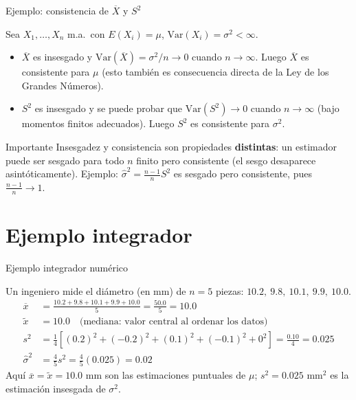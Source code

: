 \documentclass[aspectratio=169,11pt]{beamer}
\begin{document}
\begin{frame}{Ejemplo: consistencia de $\overline X$ y $S^2$}
\begin{example}
Sea $X_1,\dots,X_n$ m.a.\ con $E(X_i)=\mu$, $\mathrm{Var}(X_i)=\sigma^2<\infty$.
\begin{itemize}
\item $\overline X$ es insesgado y $\mathrm{Var}(\overline X) = \sigma^2/n \to 0$ cuando $n\to\infty$. Luego $\overline X$ es consistente para $\mu$ (esto también es consecuencia directa de la Ley de los Grandes Números).
\item $S^2$ es insesgado y se puede probar que $\mathrm{Var}(S^2)\to 0$ cuando $n\to\infty$ (bajo momentos finitos adecuados). Luego $S^2$ es consistente para $\sigma^2$.
\end{itemize}
\end{example}

\begin{alertblock}{Importante}
Insesgadez y consistencia son propiedades \textbf{distintas}: un estimador puede ser sesgado para todo $n$ finito pero consistente (el sesgo desaparece asintóticamente). Ejemplo: $\widehat\sigma^2 = \frac{n-1}{n}S^2$ es sesgado pero consistente, pues $\frac{n-1}{n}\to 1$.
\end{alertblock}
\end{frame}

\section{Ejemplo integrador}

\begin{frame}{Ejemplo integrador numérico}
\begin{example}
Un ingeniero mide el diámetro (en mm) de $n=5$ piezas: $10.2,\ 9.8,\ 10.1,\ 9.9,\ 10.0$.
\begin{align*}
\overline x &= \frac{10.2+9.8+10.1+9.9+10.0}{5} = \frac{50.0}{5} = 10.0 \\
\widetilde x &= 10.0 \quad \text{(mediana: valor central al ordenar los datos)}\\
s^2 &= \frac{1}{4}\left[(0.2)^2+(-0.2)^2+(0.1)^2+(-0.1)^2+0^2\right] = \frac{0.10}{4} = 0.025 \\
\widehat\sigma^2 &= \frac{4}{5}s^2 = \frac{4}{5}(0.025) = 0.02
\end{align*}
Aquí $\overline x = \widetilde x = 10.0$ mm son las estimaciones puntuales de $\mu$; $s^2=0.025$ mm$^2$ es la estimación insesgada de $\sigma^2$.
\end{example}
\end{frame}
\end{document}
